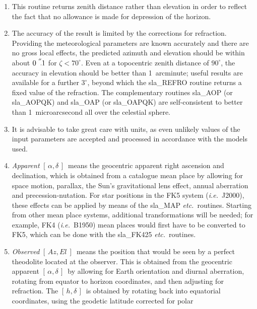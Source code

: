 \documentclass[11pt,twoside,nolof]{starlink}
\providecommand{\radec}     {$[\,\alpha,\delta\,]$}
\providecommand{\hadec}     {$[\,h,\delta\,]$}
\providecommand{\azel}      {$[\,Az,El~]$}
\providecommand{\arcsec}[2] {\arcseci{#1}$\hspace{-0.4em}.#2$}
\providecommand{\arcseci}[1] {$#1\hspace{-0.05em}$\raisebox{-0.5ex}
                         {$^{'\hspace{-0.1em}'}$}}
\begin{document}
{
 \begin{enumerate}
  \item This routine returns zenith distance rather than elevation
        in order to reflect the fact that no allowance is made for
        depression of the horizon.
  \item The accuracy of the result is limited by the corrections for
        refraction.  Providing the meteorological parameters are
        known accurately and there are no gross local effects, the
        predicted azimuth and elevation should be within about
        \arcsec{0}{1} for $\zeta<70^{\circ}$.  Even
        at a topocentric zenith distance of
        $90^{\circ}$, the accuracy in elevation should be better than
        1~arcminute;  useful results are available for a further
        $3^{\circ}$, beyond which the sla\_REFRO routine returns a
        fixed value of the refraction.  The complementary
        routines sla\_AOP (or sla\_AOPQK) and sla\_OAP (or sla\_OAPQK)
        are self-consistent to better than 1~microarcsecond all over
        the celestial sphere.
  \item It is advisable to take great care with units, as even
        unlikely values of the input parameters are accepted and
        processed in accordance with the models used.
  \item \textit{Apparent}\/ \radec\ means the geocentric apparent right ascension
        and declination, which is obtained from a catalogue mean place
        by allowing for space motion, parallax, the Sun's gravitational
        lens effect, annual aberration and precession-nutation.  For
        star positions in the FK5 system (\textit{i.e.}\ J2000), these effects can
        be applied by means of the sla\_MAP \textit{etc.}\ routines.  Starting from
        other mean place systems, additional transformations will be
        needed;  for example, FK4 (\textit{i.e.}\ B1950) mean places would first
        have to be converted to FK5, which can be done with the
        sla\_FK425 \textit{etc.}\ routines.
  \item \textit{Observed}\/ \azel\ means the position that would be seen by a
        perfect theodolite located at the observer.  This is obtained
        from the geocentric apparent \radec\ by allowing for Earth
        orientation and diurnal aberration, rotating from equator
        to horizon coordinates, and then adjusting for refraction.
        The \hadec\ is obtained by rotating back into equatorial
        coordinates, using the geodetic latitude corrected for polar

\end{enumerate}}
\end{document}
